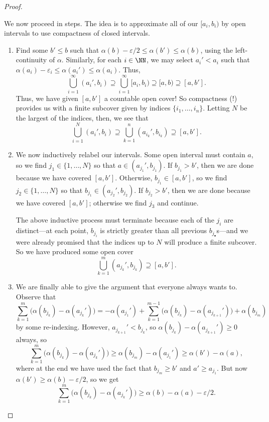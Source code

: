 \documentclass[../notes.tex]{subfiles}
\begin{document}
\begin{proof}
\begin{itemize}
		We now proceed in steps. The idea is to approximate all of our $[a_i,b_i)$ by open intervals to use compactness of closed intervals.

		\begin{enumerate}
			\item Find some $b'\le b$ such that $\alpha(b)-\varepsilon/2\le\alpha(b')\le\alpha(b)$, using the left-continuity of $\alpha$. Similarly, for each $i\in\NN$, we may select $a_i'<a_i$ such that $\alpha(a_i)-\varepsilon_i\le\alpha(a_i')\le\alpha(a_i)$. Thus,
			\[\bigcup_{i=1}^\infty(a_i',b_i)\supseteq\bigcup_{i=1}^\infty[a_i,b_i)\supseteq[a,b)\supseteq[a,b'].\]
			Thus, we have given $[a,b']$ a countable open cover! So compactness (!) provides us with a finite subcover given by indices $\{i_1,\ldots,i_n\}$. Letting $N$ be the largest of the indices, then, we see that
			\[\bigcup_{i=1}^N(a_i',b_i)\supseteq\bigcup_{k=1}^n(a_{i_k}',b_{i_k})\supseteq[a,b'].\]
			
			\item We now inductively relabel our intervals. Some open interval must contain $a$, so we find $j_1\in\{1,\ldots,N\}$ so that $a\in(a_{j_1}',b_{j_1})$. If $b_{j_1}>b'$, then we are done because we have covered $[a,b']$. Otherwise, $b_{j_1}\in[a,b']$, so we find $j_2\in\{1,\ldots,N\}$ so that $b_{j_1}\in(a_{j_2}',b_{j_2})$. If $b_{j_2}>b'$, then we are done because we have covered $[a,b']$; otherwise we find $j_3$ and continue.
	
			The above inductive process must terminate because each of the $j_i$ are distinct---at each point, $b_{j_i}$ is strictly greater than all previous $b_{j_\bullet}$s---and we were already promised that the indices up to $N$ will produce a finite subcover. So we have produced some open cover
			\[\bigcup_{k=1}^m(a_{j_k}',b_{j_k})\supseteq[a,b'].\]
			
			\item We are finally able to give the argument that everyone always wants to. Observe that
			\[\sum_{k=1}^m\big(\alpha(b_{j_k})-\alpha(a_{j_k}')\big) = -\alpha(a_{j_1}')+\sum_{k=1}^{m-1}\big(\alpha(b_{j_k})-\alpha(a_{j_{k+1}}')\big)+\alpha(b_{j_m})\]
			by some re-indexing. However, $a_{j_{k+1}}'<b_{j_k}$, so $\alpha(b_{j_k})-\alpha(a_{j_{k+1}}')\ge0$ always, so
			\[\sum_{k=1}^m\big(\alpha(b_{j_k})-\alpha(a_{j_k}')\big)\ge\alpha(b_{j_m})-\alpha(a_{j_1}')\ge\alpha(b')-\alpha(a),\]
			where at the end we have used the fact that $b_{j_m}\ge b'$ and $a'\ge a_{j_1}$. But now $\alpha(b')\ge\alpha(b)-\varepsilon/2$, so we get
			\begin{equation}
				\sum_{k=1}^m\big(\alpha(b_{j_k})-\alpha(a_{j_k}')\big)\ge\alpha(b)-\alpha(a)-\varepsilon/2. \label{eq:leb-premeas-hard-1}
			\end{equation}
			

\end{enumerate}
\end{itemize}
\end{proof}
\end{document}
